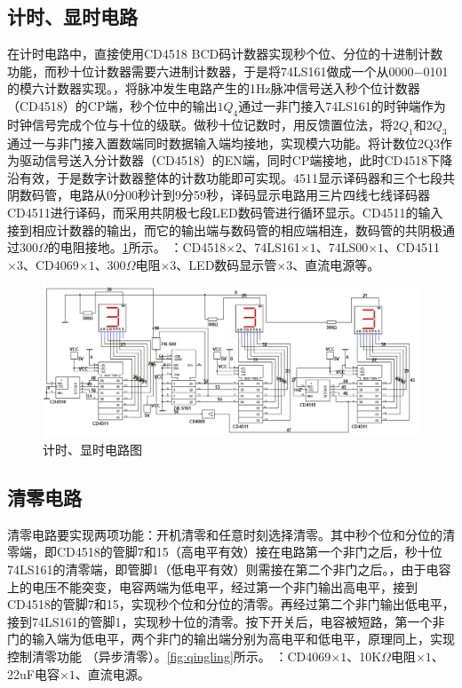 \documentclass[12pt]{article}
\begin{document}
\subsection{计时、显时电路}
在计时电路中，直接使用CD4518 BCD码计数器实现秒个位、分位的十进制计数功能，而秒十位计数器需要六进制计数器，于是将74LS161做成一个从0000$-$0101的模六计数器实现。，将脉冲发生电路产生的1Hz脉冲信号送入秒个位计数器（CD4518）的CP端，秒个位中的输出$1Q_4$通过一非门接入74LS161的时钟端作为时钟信号完成个位与十位的级联。做秒十位记数时，用反馈置位法，将$2Q_1$和$2Q_3$通过一与非门接入置数端同时数据输入端均接地，实现模六功能。将计数位2Q3作为驱动信号送入分计数器（CD4518）的EN端，同时CP端接地，此时CD4518下降沿有效，于是数字计数器整体的计数功能即可实现。4511显示译码器和三个七段共阴数码管，电路从0分00秒计到9分59秒，译码显示电路用三片四线七线译码器CD4511进行译码，而采用共阴极七段LED数码管进行循环显示。CD4511的输入接到相应计数器的输出，而它的输出端与数码管的相应端相连，数码管的共阴极通过$300\Omega$的电阻接地。\ref{fig:jishi}所示。
：CD4518$\times2$、74LS161$\times1$、74LS00$\times1$、CD4511$\times3$、CD4069$\times1$、300$\Omega$电阻$\times3$、LED数码显示管$\times3$、直流电源等。

\begin{figure}[h]
\centering
\includegraphics[width=\textwidth]{TIM20180923162121_1.png}
\caption{计时、显时电路图}
  \label{fig:jishi}
\end{figure}
\subsection{清零电路}
清零电路要实现两项功能：开机清零和任意时刻选择清零。其中秒个位和分位的清零端，即CD4518的管脚7和15（高电平有效）接在电路第一个非门之后，秒十位74LS161的清零端，即管脚1（低电平有效）则需接在第二个非门之后。，由于电容上的电压不能突变，电容两端为低电平，经过第一个非门输出高电平，接到CD4518的管脚7和15，实现秒个位和分位的清零。再经过第二个非门输出低电平，接到74LS161的管脚1，实现秒十位的清零。按下开关后，电容被短路，第一个非门的输入端为低电平，两个非门的输出端分别为高电平和低电平，原理同上，实现控制清零功能 （异步清零）。\ref{fig:qingling}所示。
：CD4069$\times1$、10K$\Omega$电阻$\times1$、22uF电容$\times1$、直流电源。
\end{document}
